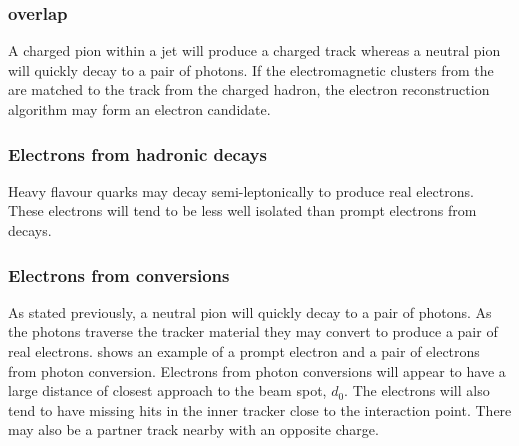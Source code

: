 \subsubsection{\HepProcess{\Ppipm \Ppizero} overlap}
A charged pion within a jet will produce a charged track whereas a neutral pion
will quickly decay to a pair of photons. If the electromagnetic clusters from
the \Ppizero are matched to the track from the charged hadron, the electron
reconstruction algorithm may form an electron candidate\cite{nikos}.

\subsubsection{Electrons from hadronic decays}
Heavy flavour quarks may decay semi-leptonically to produce real electrons. These
electrons will tend to be less well isolated than prompt electrons from \PW
decays\cite{nikos}.

\subsubsection{Electrons from conversions}
As stated previously, a neutral pion will quickly decay to a pair of photons. As
the photons traverse the tracker material they may convert to produce a pair of
real electrons\cite{nikos,barge2009conversion}.  
shows an example of a prompt electron and a pair of electrons from photon
conversion.  Electrons from photon conversions will appear to have a large
distance of closest approach to the beam spot, $d_0$.  The electrons will also
tend to have missing hits in the inner tracker close to the interaction point.
There may also be a partner track nearby with an opposite charge.

